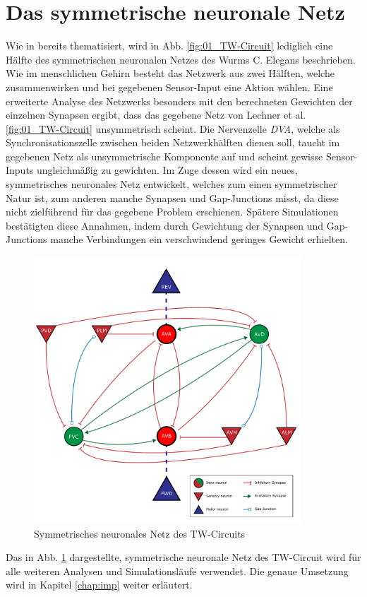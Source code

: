 \section{Das symmetrische neuronale Netz}
\label{sec:my_net}
	Wie in \cite{Wicks1996} bereits thematisiert, wird in Abb. \ref{fig:01_TW-Circuit} lediglich eine Hälfte des symmetrischen neuronalen Netzes des Wurms C. Elegans beschrieben. Wie im menschlichen Gehirn besteht das Netzwerk aus zwei Hälften, welche zusammenwirken und bei gegebenen Sensor-Input eine Aktion wählen. Eine erweiterte Analyse des Netzwerks besonders mit den berechneten Gewichten der einzelnen Synapsen ergibt, dass das gegebene Netz von Lechner et al. \ref{fig:01_TW-Circuit} unsymmetrisch scheint. Die Nervenzelle \textit{DVA}, welche als Synchronisationszelle zwischen beiden Netzwerkhälften dienen soll, taucht im gegebenen Netz als unsymmetrische Komponente auf und scheint gewisse Sensor-Inputs ungleichmäßig zu gewichten. Im Zuge dessen wird ein neues, symmetrisches neuronales Netz entwickelt, welches zum einen symmetrischer Natur ist, zum anderen manche Synapsen und Gap-Junctions misst, da diese nicht zielführend für das gegebene Problem erschienen. Spätere Simulationen bestätigten diese Annahmen, indem durch Gewichtung der Synapsen und Gap-Junctions manche Verbindungen ein verschwindend geringes Gewicht erhielten.
	\begin{figure}[H] %
		\centering
		\includegraphics[width=10cm]{figures/chap_neuron/Neural_Net_v3_plain.pdf}
		\caption{Symmetrisches neuronales Netz des TW-Circuits}
		\label{fig:nn_new}
	\end{figure}
	Das in Abb. \ref{fig:nn_new} dargestellte, symmetrische neuronale Netz des TW-Circuit wird für alle weiteren Analysen und Simulationsläufe verwendet. Die genaue Umsetzung wird in Kapitel \ref{chap:imp} weiter erläutert.
	


